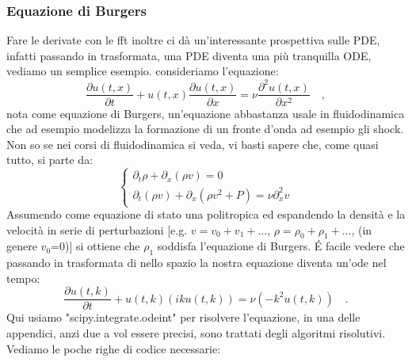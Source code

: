 \documentclass[10pt,a4paper]{article}
\begin{document}
\subsubsection{Equazione di Burgers}
Fare le derivate con le fft inoltre ci dà un'interessante prospettiva sulle PDE, infatti passando in trasformata, una PDE diventa una più tranquilla ODE, vediamo un semplice esempio. consideriamo l'equazione:
\begin{equation}
\frac{\partial u(t, x)}{\partial t} + u(t, x) \frac{\partial u(t, x)}{\partial x} = \nu \frac{\partial^2 u(t, x)}{\partial x^2} \quad,
\end{equation}
nota come equazione di Burgers, un'equazione abbastanza usale in fluidodinamica che ad esempio modelizza la formazione di un fronte d'onda ad esempio gli shock. Non so se nei corsi di fluidodinamica si veda, vi basti sapere che, come quasi tutto, si parte da:
\begin{equation}
\begin{cases}
\partial_t \rho + \partial_x (\rho v) = 0 \\
\partial_t (\rho v) + \partial_x (\rho v^2 + P) = \nu \partial_x^2 v
\end{cases}
\end{equation}
Assumendo come equazione di stato una politropica ed espandendo la densità e la velocità in serie di perturbazioni [e.g. $v = v_0 + v_1 + ...$, $\rho = \rho_0 + \rho_1 + ...$, (in genere $v_0$=0)] si ottiene che $\rho_1$ soddisfa l'equazione di Burgers.
 \'E facile vedere che passando in trasformata di nello spazio la nostra equazione diventa un'ode nel tempo:
\begin{equation}
\frac{\partial u(t, k)}{\partial t} + u(t, k) (i k u(t, k)) = \nu (- k^2 u(t, k)) \quad.
\end{equation}
Qui usiamo "scipy.integrate.odeint" per risolvere l'equazione, in una delle appendici, anzi due a vol essere precisi, sono trattati degli algoritmi risolutivi. 
Vediamo le poche righe di codice necessarie:
\end{document}
